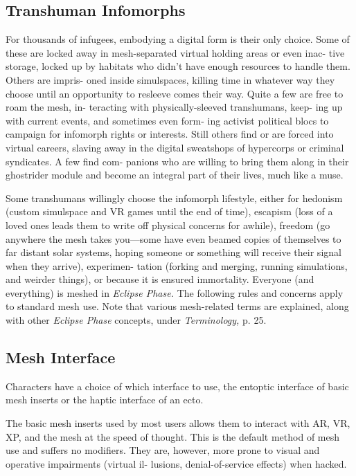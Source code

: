 \subsection{Transhuman Infomorphs}

For thousands of infugees, embodying a digital form 
is their only choice. Some of these are locked away 
in mesh-separated virtual holding areas or even inac-
tive storage, locked up by habitats who didn't have 
enough resources to handle them. Others are impris-
oned inside simulspaces, killing time in whatever way 
they choose until an opportunity to resleeve comes 
their way. Quite a few are free to roam the mesh, in-
teracting with physically-sleeved transhumans, keep-
ing up with current events, and sometimes even form-
ing activist political blocs to campaign for infomorph 
rights or interests. Still others find or are forced into 
virtual careers, slaving away in the digital sweatshops 
of hypercorps or criminal syndicates. A few find com-
panions who are willing to bring them along in their 
ghostrider module and become an integral part of 
their lives, much like a muse.

Some transhumans willingly choose the infomorph 
lifestyle, either for hedonism (custom simulspace and 
VR games until the end of time), escapism (loss of a 
loved ones leads them to write off physical concerns 
for awhile), freedom (go anywhere the mesh takes 
you—some have even beamed copies of themselves to 
far distant solar systems, hoping someone or something 
will receive their signal when they arrive), experimen-
tation (forking and merging, running simulations, and 
weirder things), or because it is ensured immortality.
Everyone (and everything) is meshed in \textit{Eclipse Phase. }
The following rules and concerns apply to standard 
mesh use. Note that various mesh-related terms are 
explained, along with other \textit{Eclipse Phase }concepts, 
under \textit{Terminology,} p. 25.

\subsection{Mesh Interface}

Characters have a choice of which interface to use, the 
entoptic interface of basic mesh inserts or the haptic 
interface of an ecto.

The basic mesh inserts used by most users allows 
them to interact with AR, VR, XP, and the mesh at the 
speed of thought. This is the default method of mesh 
use and suffers no modifiers. They are, however, more 
prone to visual and operative impairments (virtual il-
lusions, denial-of-service effects) when hacked.

